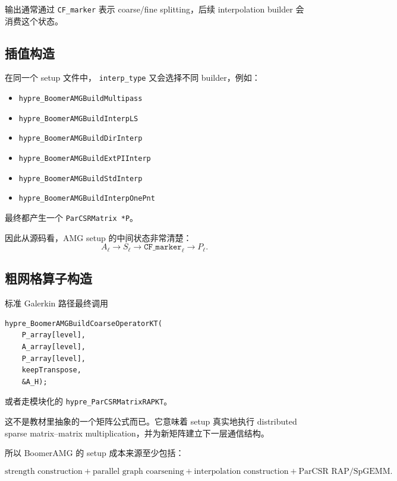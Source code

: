 输出通常通过 \texttt{CF\_marker} 表示 coarse/fine splitting，后续 interpolation builder 会消费这个状态。

\subsection{插值构造}

在同一个 setup 文件中，
\texttt{interp\_type} 又会选择不同 builder，例如：

\begin{itemize}
\item \texttt{hypre\_BoomerAMGBuildMultipass}
\item \texttt{hypre\_BoomerAMGBuildInterpLS}
\item \texttt{hypre\_BoomerAMGBuildDirInterp}
\item \texttt{hypre\_BoomerAMGBuildExtPIInterp}
\item \texttt{hypre\_BoomerAMGBuildStdInterp}
\item \texttt{hypre\_BoomerAMGBuildInterpOnePnt}
\end{itemize}

最终都产生一个 \texttt{ParCSRMatrix *P}。

因此从源码看，AMG setup 的中间状态非常清楚：
\begin{equation}
A_\ell
\rightarrow
S_\ell
\rightarrow
\texttt{CF\_marker}_\ell
\rightarrow
P_\ell.
\label{eq:software-hypre-setup-state}
\end{equation}

\subsection{粗网格算子构造}

标准 Galerkin 路径最终调用

\begin{verbatim}
hypre_BoomerAMGBuildCoarseOperatorKT(
    P_array[level],
    A_array[level],
    P_array[level],
    keepTranspose,
    &A_H);
\end{verbatim}

或者走模块化的
\texttt{hypre\_ParCSRMatrixRAPKT}。

这不是教材里抽象的一个矩阵公式而已。它意味着 setup 真实地执行 distributed sparse matrix--matrix multiplication，并为新矩阵建立下一层通信结构。

所以 BoomerAMG 的 setup 成本来源至少包括：

\begin{equation}
\boxed{
\text{strength construction}
+
\text{parallel graph coarsening}
+
\text{interpolation construction}
+
\text{ParCSR RAP/SpGEMM}.
}
\label{eq:software-hypre-setup-cost}
\end{equation}

